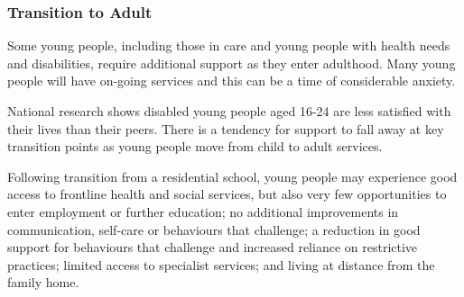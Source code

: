 \subsubsection{Transition to Adult}
Some young people, including those in care and young people with health needs and disabilities, require additional support as they enter adulthood. Many young people will have on-going services and this can be a time of considerable anxiety.

National research shows disabled young people aged 16-24 are less satisfied with their lives than their peers. There is a tendency for support to fall away at key transition points as young people move from child to adult services.

Following transition from a residential school, young people may experience good access to frontline health and social services, but also very few opportunities to enter employment or further education; no additional improvements in communication, self-care or behaviours that challenge; a reduction in good support for behaviours that challenge and increased reliance on restrictive practices; limited access to specialist services; and living at distance from the family home.


